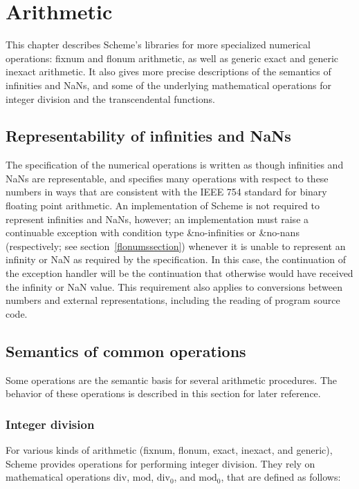 \chapter{Arithmetic}
\label{numberchapter}

This chapter describes Scheme's libraries for more specialized
numerical operations: fixnum and flonum arithmetic, as well as generic
exact and generic inexact arithmetic.  It also gives more precise
descriptions of the semantics of infinities and NaNs, and some of the
underlying mathematical operations for integer division and the
transcendental functions.

\section{Representability of infinities and NaNs}
\label{infinitiesnanssection}

The specification of the numerical operations is written as though
infinities and NaNs are representable, and specifies many operations
with respect to these numbers in ways that are consistent with the
IEEE 754 standard for binary floating point arithmetic.  
An implementation of Scheme is not required to represent infinities and
NaNs, however;
an implementation must raise a continuable exception with
condition type {\cf\&no-infinities} or {\cf\&no-nans} (respectively;
see section~\ref{flonumssection})
whenever it is unable to represent an infinity or NaN as required by
the specification.  In this case, the continuation of the exception
handler will be the continuation that otherwise would have received
the infinity or NaN value.  This requirement also applies to
conversions between numbers and external representations, including
the reading of program source code.

\section{Semantics of common operations}

Some operations are the semantic basis for several arithmetic
procedures.  The behavior of these operations is described in this
section for later reference.

\subsection{Integer division}
\label{integerdivision}

For various kinds of arithmetic (fixnum, flonum, exact, inexact, and
generic), Scheme provides operations for performing integer
division.  They rely on mathematical operations $\mathrm{div}$,
$\mathrm{mod}$, $\mathrm{div}_0$, and
$\mathrm{mod}_0$, that are defined as follows:

